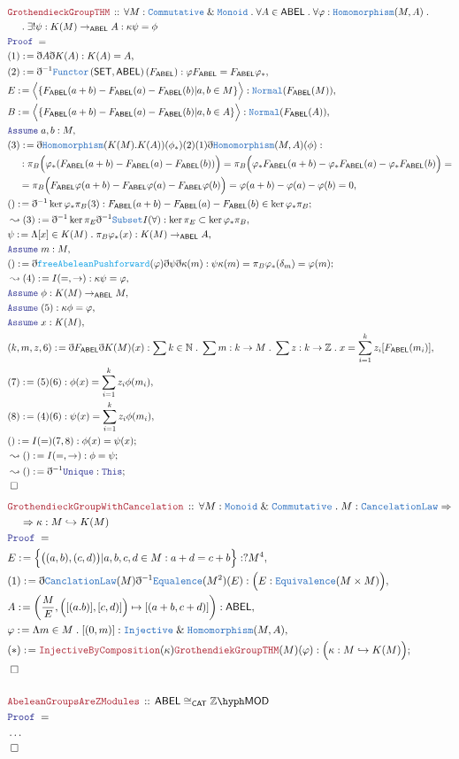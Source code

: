 \documentclass[12pt]{scrartcl}
\newcommand{\TYPE}[1]{\textcolor{NavyBlue}{\mathtt{#1}}}
\newcommand{\FUNC}[1]{\textcolor{Cerulean}{\mathtt{#1}}}
\newcommand{\LOGIC}[1]{\textcolor{Blue}{\mathtt{#1}}}
\newcommand{\THM}[1]{\textcolor{Maroon}{\mathtt{#1}}}
\renewcommand{\.}{\; . \;}
\newcommand{\de}{: \kern 0.1pc =}
\newcommand{\Theorem}[2]{& \THM{#1} \, :: \, #2 \\ & \Proof = \\ }
\newcommand{\NewLine}{\\ & \kern 1pc}
\newcommand{\Page}[1]{ \begin{align*} #1 \end{align*}   }
\newcommand{ \bd }{ \ByDef }
\newcommand{\NoProof}{ & \ldots \\ \EndProof}
\renewcommand{\And}{\; \& \;}
\newcommand{\Int}{\mathbb{Z} }
\newcommand{\Nat}{\mathbb{N} }
\newcommand{\Func}[2]{\TYPE{Functor}\left( #1, #2 \right)}
\newcommand{\ToInj}{\hookrightarrow}
\newcommand{\Say}[3]{& #1 \de #2 : #3, \\}
\newcommand{\Conclude}[3]{& #1 \de #2 : #3; \\}
\newcommand{\Derive}[3]{& \leadsto #1 \de #2 : #3, \\}
\newcommand{\DeriveConclude}[3]{& \leadsto #1 \de #2 : #3 ; \\}
\newcommand{\Assume}[2]{& \LOGIC{Assume} \; #1 : #2, \\}
\newcommand{\QED}{\; \square}
\newcommand{\EndProof}{& \QED \\}
\newcommand{\ByDef}{\eth}
\newcommand{\Proof}{\LOGIC{Proof} \; }
\newcommand{\SET}{\mathsf{SET}}
\newcommand{\ABEL}{\mathsf{ABEL}}
\begin{document}
\Page{
	\Theorem{GrothendieckGroupTHM}{  \forall M : \TYPE{Commutative} \And \TYPE{Monoid} \. \forall A \in \ABEL \.    
		\forall \varphi : \TYPE{Homomorphism}(M,A) \. 
		\NewLine \. \exists ! \psi : K(M) \to_{\ABEL} A : \kappa \psi = \phi
	}
	\Say{(1)}{\bd A \bd K(A)}{K(A) = A}
	\Say{(2)}{\bd^{-1} \Func{\SET}{\ABEL}(F_{\ABEL})}{\varphi F_{\ABEL} = F_{\ABEL} \varphi_*}
	\Say{E}{  \Big \langle \{  F_{\ABEL}(a + b) - F_{\ABEL}(a) - F_{\ABEL}(b) | a,b \in M     \}\Big\rangle  }
	{\TYPE{Normal}(F_{\ABEL}(M))}
	\Say{B}{  \Big \langle \{  F_{\ABEL}(a + b) - F_{\ABEL}(a) - F_{\ABEL}(b) | a,b \in A     \}\Big\rangle  }
	{\TYPE{Normal}(F_{\ABEL}(A))}
	\Assume{a,b}{M}
	\Say{(3)}{\bd \TYPE{Homomorphism}(K(M).K(A))(\phi_*)(2)(1)\bd \TYPE{Homomorphism}(M,A)(\phi)}
	{  
		\NewLine :
		\pi_B\Big(\varphi_*(F_{\ABEL}(a + b) - F_{\ABEL}(a) - F_{\ABEL}(b))\Big) = 
		\pi_B\Big(\varphi_*F_{\ABEL}(a + b) - \varphi_*F_{\ABEL}(a) - \varphi_*F_{\ABEL}(b) \Big) =  
		\NewLine =  \pi_B\Big(  F_{\ABEL}\varphi(a + b) - F_{\ABEL}\varphi(a) - F_{\ABEL}\varphi(b) \Big) =
		   \varphi(a + b) - \varphi(a) - \varphi(b) = 0
	}
	\Conclude{()}{\bd^{-1} \ker \varphi_*\pi_B(3)}{ F_{\ABEL}(a + b) - F_{\ABEL}(a) - F_{\ABEL}(b) \in \ker \varphi_*\pi_B }
	\Derive{(3)}{ \bd^{-1} \ker \pi_E \bd^{-1}\TYPE{Subset}I(\forall)}{\ker \pi_E \subset \ker \varphi_*\pi_B}
	\Say{\psi}{\Lambda [x] \in K(M) \. \pi_B\varphi_*(x)}{ K(M) \to_\ABEL A}
	\Assume{m}{M}
	\Conclude{()}{  \bd \FUNC{freeAbeleanPushforward}(\varphi)\bd \psi \bd \kappa(m)}
	{ \psi \kappa(m) = \pi_B \varphi_*(\delta_m) = \varphi(m)}
	\Derive{(4)}{I(=,\to)}{\kappa \psi = \varphi}
	\Assume{\phi}{K(M) \to_{\ABEL} M}
	\Assume{(5)}{\kappa \phi = \varphi}
	\Assume{x}{K(M)}
	\Say{(k,m, z, 6)}{\bd F_{\ABEL}\bd K(M)(x)}{\sum k \in \Nat \. \sum m : k \to M \. \sum z : k \to \Int \.  
		x = \sum^k_{i=1} z_i [F_{\ABEL}(m_i)]}
	\Say{(7)}{(5)(6)}{ \phi(x) = \sum^k_{i=1} z_i\phi(m_i)  }
	\Say{(8)}{(4)(6)}{\psi(x) = \sum^k_{i=1} z_i \phi(m_i) }
	\Conclude{()}{I(=)(7,8)}{\phi(x) = \psi(x)}
	\DeriveConclude{()}{I(=,\to)}{\phi = \psi}
	\DeriveConclude{()}{\bd^{-1} \LOGIC{Unique}}{\LOGIC{This}}
	\EndProof
}\Page{
	\Theorem{GrothendieckGroupWithCancelation}{\forall M : \TYPE{Monoid} \And \TYPE{Commutative} \. 
		M : \TYPE{CancelationLaw} \Rightarrow \NewLine \Rightarrow \kappa : M \ToInj K(M)}
	\Say{E}{ \Big\{ \big((a,b),(c,d)\big) | a,b,c,d \in M : a + d = c + b   \Big\}  }{?M^4}
	\Say{(1)}{\bd \TYPE{CanclationLaw}(M)\bd^{-1}\TYPE{Equalence}(M^2)(E)}{\Big( E : \TYPE{Equivalence}(M \times M) \Big)}
	\Say{A}{ \left( \frac{M}{E}, \Big([(a.b)],[c,d)]\Big) \mapsto [(a+b,c + d)] \right) }{\ABEL}
	\Say{\varphi}{\Lambda m \in M \. [(0,m)]}{ \TYPE{Injective} \And \TYPE{Homomorphism}(M,A) }
	\Conclude{(*)}{ \THM{InjectiveByComposition}(\kappa)\THM{GrothendiekGroupTHM}(M)(\varphi) }
	{\Big( \kappa : M \ToInj K(M) \Big)}
	\EndProof
	\\
	\Theorem{AbeleanGroupsAreZModules}{\ABEL \cong_{\mathsf{CAT}} \Int\hyph\mathsf{MOD}}
	\NoProof
	}
\newpage
\end{document}
